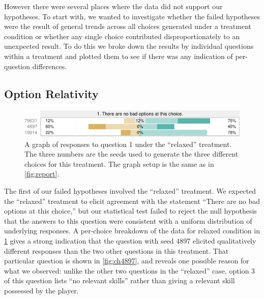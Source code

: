 However there were several places where the data did not support our hypotheses.
%
To start with, we wanted to investigate whether the failed hypotheses were the result of general trends across all choices generated under a treatment condition or whether any single choice contributed disproportionately to an unexpected result.
%
To do this we broke down the results by individual questions within a treatment and plotted them to see if there was any indication of per-question differences.


\subsection{Option Relativity}


\begin{figure}[!h]
  \includegraphics[width=\textwidth]{fig/relaxed-q1.pdf}
  \caption{A graph of responses to question 1 under the ``relaxed'' treatment. The three numbers are the seeds used to generate the three different choices for this treatment. The graph setup is the same as in \cref{fig:report}.}
  \label{fig:relaxedq1}
\end{figure}


The first of our failed hypotheses involved the ``relaxed'' treatment.
%
We expected the ``relaxed'' treatment to elicit agreement with the statement ``There are no bad options at this choice,'' but our statistical test failed to reject the null hypothesis that the answers to this question were consistent with a uniform distribution of underlying responses.
%
A per-choice breakdown of the data for relaxed condition in \cref{fig:relaxedq1} gives a strong indication that the question with seed 4897 elicited qualitatively different responses than the two other questions in this treatment.
%
That particular question is shown in \cref{fig:ch4897}, and reveals one possible reason for what we observed: unlike the other two questions in the ``relaxed'' case, option 3 of this question lists ``no relevant skills'' rather than giving a relevant skill possessed by the player.


